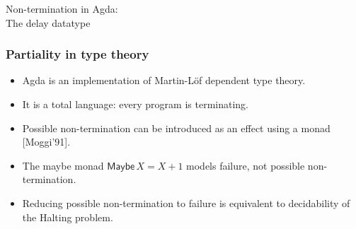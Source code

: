 \documentclass[12pt,t]{beamer}
\newcommand{\Pio}{\ensuremath{\mathsf{\Pi}^{\mathsf{o}}}}
\newcommand{\lr}{\longleftrightarrow}
\newcommand{\LR}{\iff}
\renewcommand{\dagger}{\mathsf{dagger}}
\newcommand{\Maybe}{\mathsf{Maybe}}
\begin{document}

\begin{frame}[c]
  \begin{center}
    \Huge Non-termination in Agda: \\ The delay datatype
  \end{center}
\end{frame}

\begin{frame}
  \frametitle{Partiality in type theory}
  \begin{itemize}
  \item Agda is an implementation of Martin-L\"of dependent type theory.
  \item It is a total language: every program is terminating.
  \item Possible non-termination can be introduced as an effect using a monad
    [Moggi'91].
    \pause
    \vspace{\fill}
    \item The maybe monad $\Maybe \,X = X + 1$ models
      failure, not possible non-termination.
     \item Reducing possible non-termination to failure is equivalent
       to decidability of the Halting problem.
  \end{itemize}
  
\end{frame}
\end{document}
